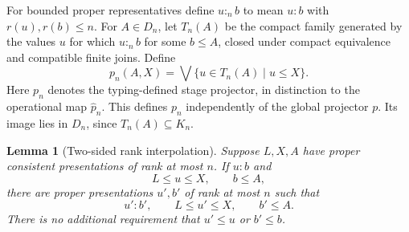 \documentclass[11pt,a4paper]{article}
\newtheorem{lemma}[theorem]{Lemma}
\theoremstyle{definition}
\theoremstyle{remark}
\newcommand{\lub}{\bigvee}
\begin{document}
For bounded proper representatives define $u:_n b$ to mean $u:b$ with
$r(u),r(b)\leq n$. For $A\in D_n$, let $T_n(A)$ be the compact family
generated by the values $u$ for which $u:_n b$ for some $b\leq A$,
closed under compact equivalence and compatible finite joins. Define
\[
 p_n(A,X)=\lub\{u\in T_n(A)\mid u\leq X\}.
\]
Here $p_n$ denotes the typing-defined stage projector, in distinction
to the operational map $\widehat p_n$. This defines $p_n$ independently
of the global projector $p$.
Its image lies in $D_n$, since $T_n(A)\subseteq K_n$.

\begin{lemma}[Two-sided rank interpolation]\label{lem:rank-interpolation}
Suppose $L,X,A$ have proper consistent presentations of rank at most
$n$. If $u:b$ and
\[
 L\leq u\leq X,\qquad b\leq A,
\]
there are proper presentations $u',b'$ of rank at most $n$ such that
\[
 u':b',\qquad L\leq u'\leq X,\qquad b'\leq A.
\]
There is no additional requirement that $u'\leq u$ or $b'\leq b$.
\end{lemma}
\end{document}
